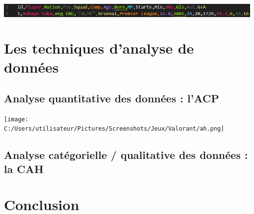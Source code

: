 \documentclass[11pt]{scrartcl}
\begin{document}
        \begin{center}

            \includegraphics[width=1\textwidth]{images/exemple_entree.png}

        \end{center}    




    \section{Les techniques d'analyse de données}

    \subsection{Analyse quantitative des données : l'ACP}
    \texttt{[image: C:/Users/utilisateur/Pictures/Screenshots/Jeux/Valorant/ah.png]}
    \subsection{Analyse catégorielle / qualitative des données : la CAH}




    \section{Conclusion}
\end{document}
